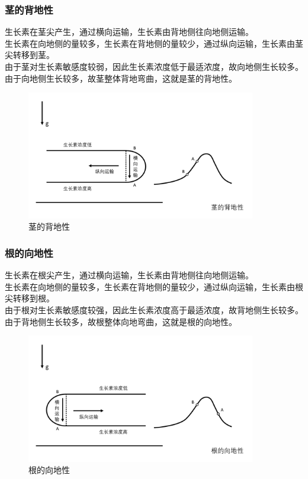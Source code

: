 \documentclass[UTF8]{ctexart}
\begin{document}
\newpage

\subsubsection{茎的背地性}
    生长素在茎尖产生，通过横向运输，生长素由背地侧往向地侧运输。\\[3mm]
    生长素在向地侧的量较多，生长素在背地侧的量较少，通过纵向运输，生长素由茎尖转移到茎。\\[3mm]
    由于茎对生长素敏感度较弱，因此生长素浓度低于最适浓度，故向地侧生长较多。\\[3mm]
    由于向地侧生长较多，故茎整体背地弯曲，这就是茎的背地性。
    \begin{figure}[h]
        \begin{center}
            \includegraphics[width=10cm]{BiologyImage/19.jpg}
            \caption{茎的背地性}
        \end{center}
    \end{figure}\vspace{-25pt}

\subsubsection{根的向地性}
    生长素在根尖产生，通过横向运输，生长素由背地侧往向地侧运输。\\[3mm]
    生长素在向地侧的量较多，生长素在背地侧的量较少，通过纵向运输，生长素由根尖转移到根。\\[3mm]
    由于根对生长素敏感度较强，因此生长素浓度高于最适浓度，故背地侧生长较多。\\[3mm]
    由于背地侧生长较多，故根整体向地弯曲，这就是根的向地性。
    \begin{figure}[h]
        \begin{center}
            \includegraphics[width=10cm]{BiologyImage/20.jpg}
            \caption{根的向地性}
        \end{center}
    \end{figure}
\end{document}
